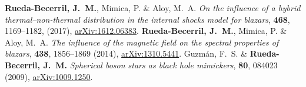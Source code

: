 \begin{thebibliography}{99}
   \textbf{Rueda-Becerril, J.~M.}, Mimica, P. \& Aloy, M.~A. \textit{On the influence of a hybrid thermal--non-thermal distribution in the internal shocks model for blazars}, \href{https://doi.org/10.1093/mnras/stx476}{\mnras} \textbf{468}, 1169--1182, (2017), \href{https://arxiv.org/abs/1612.06383}{arXiv:1612.06383}.
   \textbf{Rueda-Becerril, J.~M.}, Mimica, P. \& Aloy, M.~A. \textit{The influence of the magnetic field on the spectral properties of blazars}, \href{https://doi.org/10.1093/mnras/stt2335}{\mnras} \textbf{438}, 1856--1869 (2014), \href{https://arxiv.org/abs/1310.5441}{arXiv:1310.5441}.
   Guzmán, F.~S. \& \textbf{Rueda-Becerril, J.~M.} \textit{Spherical boson stars as black hole mimickers},  \href{https://doi.org/10.1103/PhysRevD.80.084023}{\prd} \textbf{80}, 084023 (2009), \href{https://arxiv.org/abs/1009.1250}{arXiv:1009.1250}.
\end{thebibliography}

